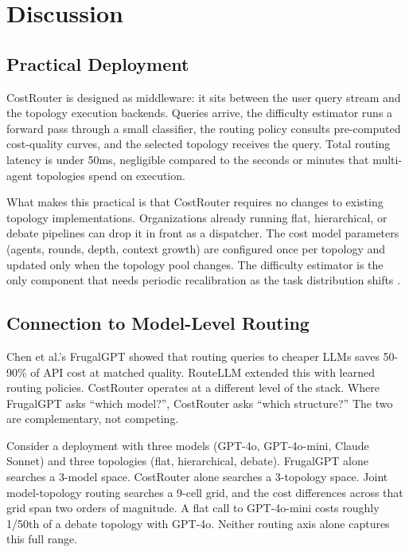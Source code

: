 \section{Discussion}\label{discussion}\label{sec:discussion}

\subsection{Practical Deployment}\label{practical-deployment}

CostRouter is designed as middleware: it sits between the user query stream and the topology execution backends. Queries arrive, the difficulty estimator runs a forward pass through a small classifier, the routing policy consults pre-computed cost-quality curves, and the selected topology receives the query. Total routing latency is under 50ms, negligible compared to the seconds or minutes that multi-agent topologies spend on execution.

What makes this practical is that CostRouter requires no changes to existing topology implementations. Organizations already running flat, hierarchical, or debate pipelines can drop it in front as a dispatcher. The cost model parameters (agents, rounds, depth, context growth) are configured once per topology and updated only when the topology pool changes. The difficulty estimator is the only component that needs periodic recalibration as the task distribution shifts \cite{wu_2023}.

\subsection{Connection to Model-Level Routing}\label{connection-to-model-level-routing}

Chen et al.'s FrugalGPT \cite{chen_2023_frugalgpt} showed that routing queries to cheaper LLMs saves 50-90\% of API cost at matched quality. RouteLLM \cite{ong_2024} extended this with learned routing policies. CostRouter operates at a different level of the stack. Where FrugalGPT asks ``which model?'', CostRouter asks ``which structure?'' The two are complementary, not competing.

Consider a deployment with three models (GPT-4o, GPT-4o-mini, Claude Sonnet) and three topologies (flat, hierarchical, debate). FrugalGPT alone searches a 3-model space. CostRouter alone searches a 3-topology space. Joint model-topology routing searches a 9-cell grid, and the cost differences across that grid span two orders of magnitude. A flat call to GPT-4o-mini costs roughly 1/50th of a debate topology with GPT-4o. Neither routing axis alone captures this full range.

